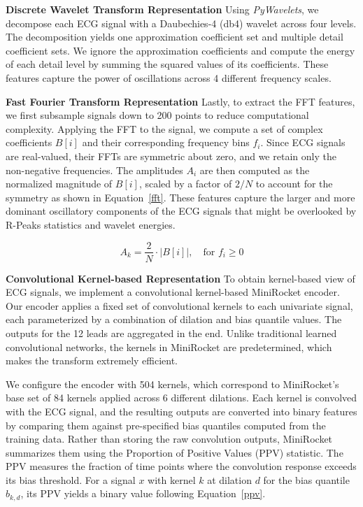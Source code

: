 \documentclass[twocolumn]{cinc}
\begin{document}
\noindent \textbf{Discrete Wavelet Transform Representation}
Using \textit{PyWavelets}, we decompose each ECG signal with a Daubechies-4 (db4) wavelet across four levels. The decomposition yields one approximation coefficient set and multiple detail coefficient sets. We ignore the approximation coefficients and compute the energy of each detail level by summing the squared values of its coefficients. These features capture the power of oscillations across 4 different frequency scales.


\noindent \textbf{Fast Fourier Transform Representation}
Lastly, to extract the FFT features, we first subsample signals down to 200 points to reduce computational complexity. Applying the FFT to the signal, we compute a set of complex coefficients $B[i]$ and their corresponding frequency bins $f_i$. Since ECG signals are real-valued, their FFTs are symmetric about zero, and we retain only the non-negative frequencies. The amplitudes $A_i$ are then computed as the normalized magnitude of $B[i]$, scaled by a factor of $2/N$ to account for the symmetry as shown in Equation~\ref{fft}. These features capture the larger and more dominant oscillatory components of the ECG signals that might be overlooked by R-Peaks statistics and wavelet energies.

\begin{equation}
    A_k = \frac{2}{N} \cdot \left| B[i] \right|, \quad \text{for } f_i \geq 0
    \label{fft}
\end{equation}

\noindent \textbf{Convolutional Kernel-based Representation}
To obtain kernel-based view of ECG signals, we implement a convolutional kernel-based MiniRocket encoder. Our encoder applies a fixed set of convolutional kernels to each univariate signal, each parameterized by a combination of dilation and bias quantile values. The outputs for the 12 leads are aggregated in the end. Unlike traditional learned convolutional networks, the kernels in MiniRocket are predetermined, which makes the transform extremely efficient.

We configure the encoder with 504 kernels, which correspond to MiniRocket’s base set of 84 kernels applied across 6 different dilations. Each kernel is convolved with the ECG signal, and the resulting outputs are converted into binary features by comparing them against pre-specified bias quantiles computed from the training data. Rather than storing the raw convolution outputs, MiniRocket summarizes them using the Proportion of Positive Values (PPV) statistic. The PPV measures the fraction of time points where the convolution response exceeds its bias threshold. For a signal $x$ with kernel $k$ at dilation $d$ for the bias quantile $b_{k,d}$, its PPV yields a binary value following Equation~\ref{ppv}.
\end{document}
